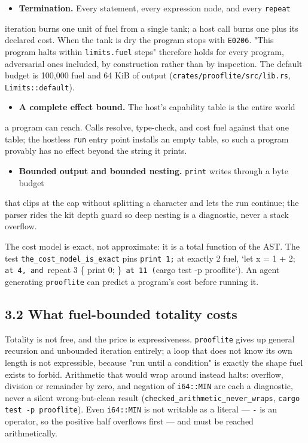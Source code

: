 \documentclass[11pt]{article}
\newcommand{\code}[1]{\texttt{#1}}
\begin{document}
\begin{itemize}[leftmargin=*]
\item \textbf{Termination.} Every statement, every expression node, and every \code{repeat}
\end{itemize}
  iteration burns one unit of fuel from a single tank; a host call burns one
  plus its declared cost. When the tank is dry the program stops with \code{E0206}.
  "This program halts within \code{limits.fuel} steps" therefore holds for every
  program, adversarial ones included, by construction rather than by
  inspection. The default budget is 100,000 fuel and 64 KiB of output
  (\code{crates/prooflite/src/lib.rs}, \code{Limits::default}).
\begin{itemize}[leftmargin=*]
\item \textbf{A complete effect bound.} The host's capability table is the entire world
\end{itemize}
  a program can reach. Calls resolve, type-check, and cost fuel against that one
  table; the hostless \code{run} entry point installs an empty table, so such a
  program provably has no effect beyond the string it prints.
\begin{itemize}[leftmargin=*]
\item \textbf{Bounded output and bounded nesting.} \code{print} writes through a byte budget
\end{itemize}
  that clips at the cap without splitting a character and lets the run continue;
  the parser rides the kit depth guard so deep nesting is a diagnostic, never a
  stack overflow.

The cost model is exact, not approximate: it is a total function of the AST. The
test \code{the\_cost\_model\_is\_exact} pins \code{print 1;} at exactly 2 fuel, `let x = 1 +
2;\code{ at 4, and }repeat 3 \{ print 0; \}\code{ at 11 (}cargo test -p prooflite`). An
agent generating \code{prooflite} can predict a program's cost before running it.

\subsection*{3.2 What fuel-bounded totality costs}

Totality is not free, and the price is expressiveness. \code{prooflite} gives up
general recursion and unbounded iteration entirely; a loop that does not know
its own length is not expressible, because "run until a condition" is exactly
the shape fuel exists to forbid. Arithmetic that would wrap around instead
halts: overflow, division or remainder by zero, and negation of \code{i64::MIN} are
each a diagnostic, never a silent wrong-but-clean result
(\code{checked\_arithmetic\_never\_wraps}, \code{cargo test -p prooflite}). Even \code{i64::MIN}
is not writable as a literal --- \code{-} is an operator, so the positive half
overflows first --- and must be reached arithmetically.
\end{document}
